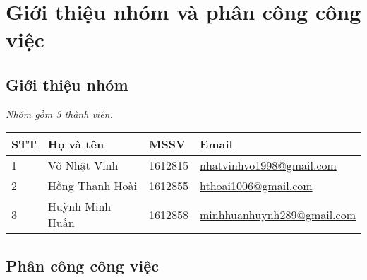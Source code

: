 \section{Giới thiệu nhóm và phân công công việc}
\subsection{Giới thiệu nhóm}
\textit{Nhóm gồm 3 thành viên.}   	
\begin{table*}[h]\centering
{}
\begin{tabular}{llll}\toprule
\textbf{STT} & \textbf{Họ và tên} & \textbf{MSSV} & \textbf{Email}\\\midrule
1 & Võ Nhật Vinh & 1612815 & \href{mailto:nhatvinhvo1998@gmail.com}{nhatvinhvo1998@gmail.com}\\
2 & Hồng Thanh Hoài & 1612855 & \href{mailto:hthoai1006@gmail.com}{hthoai1006@gmail.com}\\
3 & Huỳnh Minh Huấn & 1612858 & \href{mailto:minhhuanhuynh289@gmail.com}{minhhuanhuynh289@gmail.com}\\
\bottomrule
\end{tabular}
\end{table*}

\subsection{Phân công công việc}


